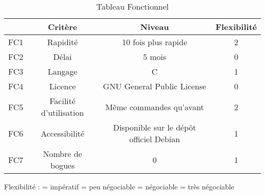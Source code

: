 \begin{table}[h]
\begin{center}
\begin{tabular}{|c|c|c|c|}
\hline
 & Crit\`ere & Niveau & Flexibilit\'e \\
\hline
 FC1 & Rapidit\'e & 10 fois plus rapide & 2 \\
\hline
 FC2 & D\'elai & 5 mois & 0 \\
\hline
 FC3 & Langage & C & 1 \\
\hline
 FC4 & Licence & GNU General Public License & 0 \\
\hline
 FC5 & Facilit\'e d'utilisation & M\^eme commandes qu'avant & 2 \\
\hline
 FC6 & Accessibilit\'e & Disponible sur le d\'ep\^ot officiel Debian & 1 \\
\hline
 FC7 & Nombre de bogues & 0 & 1 \\
\hline
\end{tabular}
\caption{Tableau Fonctionnel}
\end{center}
\label{tab:tabfonctionnel}
\end{table}

Flexibilit\'e :  = imp\'eratif = peu n\'egociable = n\'egociable = tr\`es n\'egociable\newline



